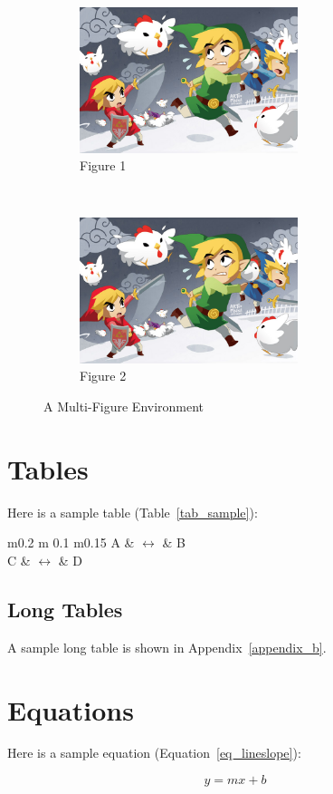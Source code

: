 \begin{figure}[ht]
	\centering
	\begin{subfigure}[t]{\textwidth}
		\centering
		\includegraphics[width=0.7\textwidth]{figures/Sample/tumblr_static_eaceks0rfxsss8o4swscw40wo.jpg}
		\caption{Figure 1}
		\label{fig_multienv_1}
	\end{subfigure}
	~
	\begin{subfigure}[t]{\textwidth}
		\centering
		\includegraphics[width=0.7\textwidth]{figures/Sample/tumblr_static_eaceks0rfxsss8o4swscw40wo.jpg}
		\caption{Figure 2}
		\label{fig_multienv_2}
	\end{subfigure}
	
	\caption{A Multi-Figure Environment}
	\label{fig_multienv}
\end{figure}

\section{Tables}

Here is a sample table (Table~\ref{tab_sample}):

	\begin{table}[ht]
	\centering
	\begin{tabular}{ m{} m {0.1\textwidth} m{0.15\textwidth} }
		\toprule
		A & $\longleftrightarrow$ & B \\
		C & $\longleftrightarrow$ & D \\
		\bottomrule	
	\end{tabular}	
	\caption{A sample table}	
	\label{tab_sample}
\end{table}

\subsection{Long Tables}
A sample long table is shown in Appendix~\ref{appendix_b}.

\section{Equations}

Here is a sample equation (Equation~\ref{eq_lineslope}):

\begin{equation} \label{eq_lineslope}
	y = mx + b
\end{equation}